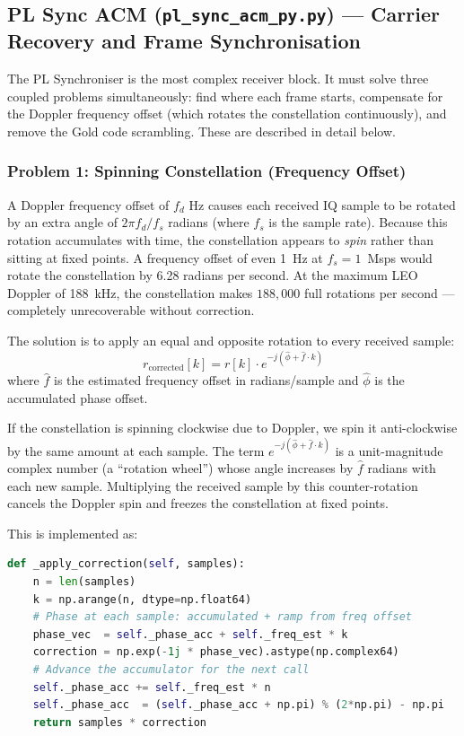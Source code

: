 \documentclass[12pt,a4paper]{report}
\begin{document}
\subsection{PL Sync ACM (\texttt{pl\_sync\_acm\_py.py}) --- Carrier Recovery and Frame Synchronisation}
\label{sec:pl_sync}

The PL Synchroniser is the most complex receiver block. It must solve three
coupled problems simultaneously: find where each frame starts, compensate for
the Doppler frequency offset (which rotates the constellation continuously),
and remove the Gold code scrambling. These are described in detail below.

\subsubsection{Problem 1: Spinning Constellation (Frequency Offset)}

A Doppler frequency offset of $f_d$ Hz causes each received IQ sample to be
rotated by an extra angle of $2\pi f_d / f_s$ radians (where $f_s$ is the
sample rate). Because this rotation accumulates with time, the constellation
appears to \emph{spin} rather than sitting at fixed points. A frequency offset
of even 1~Hz at $f_s = 1$~Msps would rotate the constellation by 6.28 radians
per second. At the maximum LEO Doppler of 188~kHz, the constellation makes
$188,000$ full rotations per second --- completely unrecoverable without
correction.

The solution is to apply an equal and opposite rotation to every received
sample:
\begin{equation}
    r_\text{corrected}[k] = r[k] \cdot e^{-j(\hat{\phi} + \hat{f} \cdot k)}
\end{equation}
where $\hat{f}$ is the estimated frequency offset in radians/sample and
$\hat{\phi}$ is the accumulated phase offset.

\begin{plainenglish}
If the constellation is spinning clockwise due to Doppler, we spin it
anti-clockwise by the same amount at each sample.  The term $e^{-j(\hat{\phi}
+ \hat{f} \cdot k)}$ is a unit-magnitude complex number (a ``rotation wheel'')
whose angle increases by $\hat{f}$ radians with each new sample.  Multiplying
the received sample by this counter-rotation cancels the Doppler spin and
freezes the constellation at fixed points.
\end{plainenglish} This is implemented as:

\begin{lstlisting}[language=python, caption={Per-sample frequency and phase correction}]
def _apply_correction(self, samples):
    n = len(samples)
    k = np.arange(n, dtype=np.float64)
    # Phase at each sample: accumulated + ramp from freq offset
    phase_vec  = self._phase_acc + self._freq_est * k
    correction = np.exp(-1j * phase_vec).astype(np.complex64)
    # Advance the accumulator for the next call
    self._phase_acc += self._freq_est * n
    self._phase_acc  = (self._phase_acc + np.pi) % (2*np.pi) - np.pi
    return samples * correction
\end{lstlisting}
\end{document}
